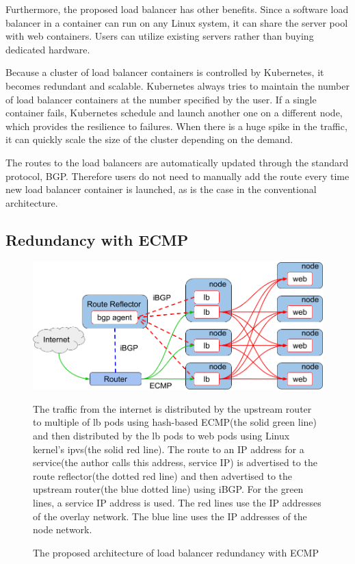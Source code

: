 Furthermore, the proposed load balancer has other benefits.
Since a software load balancer in a container can run on any Linux system, it can share the server pool with web containers.
Users can utilize existing servers rather than buying dedicated hardware.

Because a cluster of load balancer containers is controlled by Kubernetes, it becomes redundant and scalable.
Kubernetes always tries to maintain the number of load balancer containers at the number specified by the user.
If a single container fails, Kubernetes schedule and launch another one on a different node, which provides the resilience to failures.
When there is a huge spike in the traffic, it can quickly scale the size of the cluster depending on the demand.

The routes to the load balancers are automatically updated through the standard protocol, BGP.
Therefore users do not need to manually add the route every time new load balancer container is launched, as is the case in the conventional architecture.

\FloatBarrier

\subsection{Redundancy with ECMP}

\begin{figure}[tb]
  \centering
  \includegraphics[width=0.8\columnwidth]{Figs/ecmp.png}
\caption{The proposed architecture of load balancer redundancy with ECMP}

\vspace{1mm}

\begin{minipage}{0.9\columnwidth}
  The traffic from the internet is distributed by the upstream router to multiple of lb pods using hash-based ECMP(the solid green line) and then distributed by the lb pods to web pods using Linux kernel's ipvs(the solid red line).
  The route to an IP address for a service(the author calls this address, service IP) is advertised to the route reflector(the dotted red line) and then advertised to the upstream router(the blue dotted line) using iBGP.
  For the green lines, a service IP address is used. The red lines use the IP addresses of the overlay network. The blue line uses the IP addresses of the node network.
\end{minipage}

\label{fig:ecmp}
\end{figure}

